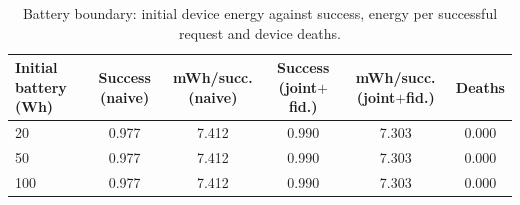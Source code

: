 \begin{table}
\centering
\footnotesize
\caption{Battery boundary: initial device energy against success, energy per successful request and device deaths.}
\label{tab:p2-energy}
\begin{tabular}{lccccc}
\toprule
Initial battery (Wh) & Success (naive) & mWh/succ. (naive) & Success (joint$+$fid.) & mWh/succ. (joint$+$fid.) & Deaths \\
\midrule
20 & 0.977 & 7.412 & 0.990 & 7.303 & 0.000 \\
50 & 0.977 & 7.412 & 0.990 & 7.303 & 0.000 \\
100 & 0.977 & 7.412 & 0.990 & 7.303 & 0.000 \\
\bottomrule
\end{tabular}
\par\vspace{2pt}{\footnotesize\raggedright No device dies at any level, so the battery is not a binding constraint in this scenario and the energy term of the objective cannot earn its keep. The three rows are identical because initial charge changes depletion time, not the energy the same work costs.\par}
\end{table}
